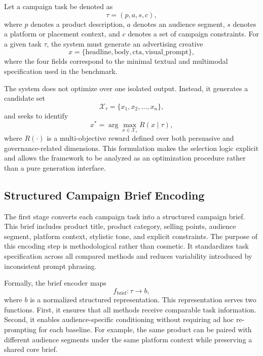 \documentclass[applsci,article,submit,pdftex,moreauthors]{Definitions/mdpi}
\begin{document}
Let a campaign task be denoted as
\begin{equation}
\tau = (p, a, s, c),
\end{equation}
where $p$ denotes a product description, $a$ denotes an audience segment, $s$ denotes a platform or placement context, and $c$ denotes a set of campaign constraints. For a given task $\tau$, the system must generate an advertising creative
\begin{equation}
x = \{\text{headline}, \text{body}, \text{cta}, \text{visual\_prompt}\},
\end{equation}
where the four fields correspond to the minimal textual and multimodal specification used in the benchmark.

The system does not optimize over one isolated output. Instead, it generates a candidate set
\begin{equation}
\mathcal{X}_{\tau} = \{x_1, x_2, \dots, x_n\},
\end{equation}
and seeks to identify
\begin{equation}
x^{*} = \arg\max_{x \in \mathcal{X}_{\tau}} R(x \mid \tau),
\end{equation}
where $R(\cdot)$ is a multi-objective reward defined over both persuasive and governance-related dimensions. This formulation makes the selection logic explicit and allows the framework to be analyzed as an optimization procedure rather than a pure generation interface.

\subsection{Structured Campaign Brief Encoding}

The first stage converts each campaign task into a structured campaign brief. This brief includes product title, product category, selling points, audience segment, platform context, stylistic tone, and explicit constraints. The purpose of this encoding step is methodological rather than cosmetic. It standardizes task specification across all compared methods and reduces variability introduced by inconsistent prompt phrasing.

Formally, the brief encoder maps
\begin{equation}
f_{\mathrm{brief}}: \tau \rightarrow b,
\end{equation}
where $b$ is a normalized structured representation. This representation serves two functions. First, it ensures that all methods receive comparable task information. Second, it enables audience-specific conditioning without requiring ad hoc re-prompting for each baseline. For example, the same product can be paired with different audience segments under the same platform context while preserving a shared core brief.
\end{document}
